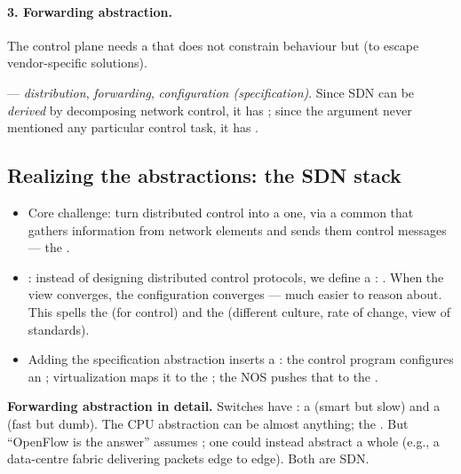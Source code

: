 \paragraph{3. Forwarding abstraction.} The control plane needs a  that does not constrain behaviour but  (to escape vendor-specific solutions).

\begin{keybox}
 --- \emph{distribution}, \emph{forwarding}, \emph{configuration (specification)}. Since SDN can be \emph{derived} by decomposing network control, it has ; since the argument never mentioned any particular control task, it has .
\end{keybox}

\subsection{Realizing the abstractions: the SDN stack}
\begin{itemize}
\item Core challenge: turn distributed control into a  one, via a common  that gathers information from network elements and sends them control messages --- the .
\item {}: instead of designing distributed control protocols, we define a : . When the view converges, the configuration converges --- much easier to reason about. This spells the  (for control) and the  (different culture, rate of change, view of standards).
\item Adding the specification abstraction inserts a : the control program configures an ; virtualization maps it to the ; the NOS pushes that to the .
\end{itemize}
\textbf{Forwarding abstraction in detail.} Switches have : a  (smart but slow) and a  (fast but dumb). The CPU abstraction can be almost anything; the . But ``OpenFlow is the answer'' assumes ; one could instead abstract a whole  (e.g., a data-centre fabric delivering packets edge to edge). Both are SDN.

